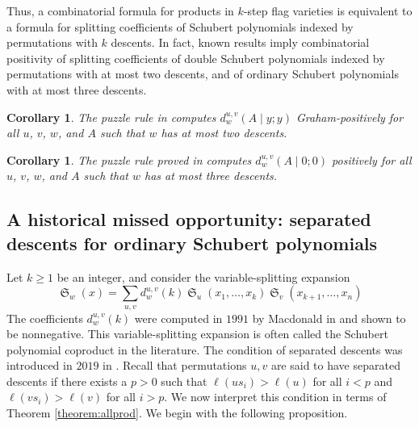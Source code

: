 \documentclass[reqno]{amsart}
\newtheorem{corollary}[lemma]{Corollary}
\theoremstyle{definition}
\theoremstyle{remark}
\numberwithin{equation}{subsection}
\DeclareMathOperator{\sch}{\mathfrak{S}}
\newcommand{\cpcf}[5]{d^{#1,#2}_{#3}\left(#4\mid #5\right)}
\begin{document}
Thus, a combinatorial formula for products in $k$-step flag varieties is equivalent to a formula for splitting coefficients of Schubert polynomials indexed by permutations with $k$ descents. In fact, known results imply combinatorial positivity of splitting coefficients of double Schubert polynomials indexed by permutations with at most two descents, and of ordinary Schubert polynomials with at most three descents.

\begin{corollary}
The puzzle rule in \cite{buch2015mutations} computes $\cpcf{u}{v}{w}{A}{y;y}$ Graham-positively for all $u$, $v$, $w$, and $A$ such that $w$ has at most two descents.
\end{corollary}

\begin{corollary}
The puzzle rule proved in \cite{threestep} computes $\cpcf{u}{v}{w}{A}{0;0}$ positively for all $u$, $v$, $w$, and $A$ such that $w$ has at most three descents.
\end{corollary}

\subsection{A historical missed opportunity: separated descents for ordinary Schubert polynomials}

Let $k\geq 1$ be an integer, and consider the variable-splitting expansion
$$\sch_w(x)=\sum_{u,v}d_w^{u,v}(k)\sch_u(x_1,\ldots,x_k)\sch_v(x_{k+1},\ldots,x_n)$$
The coefficients $d_w^{u,v}(k)$ were computed in $1991$ by Macdonald in \cite[(4.19)]{notes} and shown to be nonnegative. This variable-splitting expansion is often called the Schubert polynomial coproduct in the literature. The condition of separated descents was introduced in $2019$ in \cite{kzj}. Recall that permutations $u,v$ are said to have separated descents if there exists a $p>0$ such that $\ell(us_i)>\ell(u)$ for all $i<p$ and $\ell(vs_i)>\ell(v)$ for all $i>p$. We now interpret this condition in terms of Theorem \ref{theorem:allprod}. We begin with the following proposition.
\end{document}

